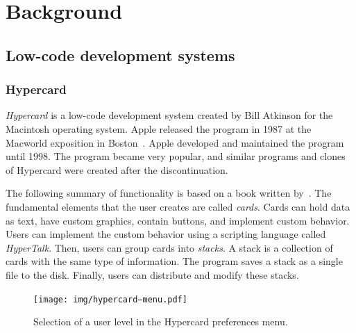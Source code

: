 \chapter{Background}
\label{chap:background}

\section{Low-code development systems}
\label{sec:low-code}

\subsection{Hypercard}
\emph{Hypercard} is a low-code development system created by Bill Atkinson for the Macintosh operating system. Apple released the program in 1987 at the
Macworld exposition in Boston~\cite{hyper_release}. Apple developed and maintained the program until 1998. The program became very popular, and similar programs and clones of Hypercard were created after the discontinuation.


The following summary of functionality is based on a book written by~\citet{goodman_hypertext}.
The fundamental elements that the user creates are called \emph{cards}. Cards can hold data as text, have custom graphics, contain buttons, and implement custom behavior.
Users can implement the custom behavior using a scripting language called \emph{HyperTalk}. Then, users can group cards into \emph{stacks}. A stack is a collection of cards with the same type of information.
The program saves a stack as a single file to the disk. Finally, users can distribute and modify these stacks.

\begin{figure}
	\centering
	\texttt{[image: img/hypercard−menu.pdf]}
	\caption{Selection of a user level in the Hypercard preferences menu.}
	\label{fig:f}
\end{figure}


